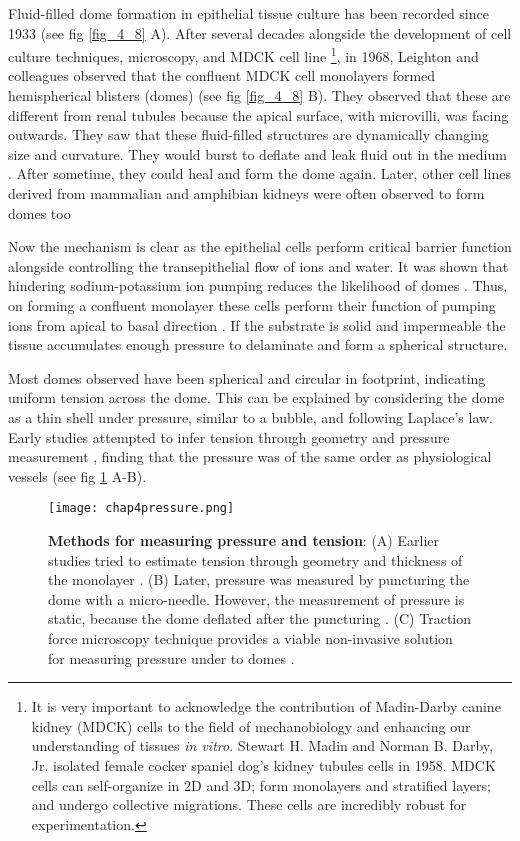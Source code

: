 Fluid-filled dome formation in epithelial tissue culture has been recorded since 1933 \cite{cameron1953} (see fig \ref{fig_4_8} A). After several decades alongside the development of cell culture techniques, microscopy, and MDCK cell line \footnote{It is very important to acknowledge the contribution of Madin-Darby canine kidney (MDCK) cells to the field of mechanobiology and enhancing our understanding of tissues \textit{in vitro}. Stewart H. Madin and Norman B. Darby, Jr. isolated female cocker spaniel dog’s kidney tubules cells in 1958. MDCK cells can self-organize in 2D and 3D; form monolayers and stratified layers; and undergo collective migrations. These cells are incredibly robust for experimentation.}, in 1968, Leighton and colleagues observed that the confluent MDCK cell monolayers formed hemispherical blisters (domes) \cite{leighton1969} (see fig \ref{fig_4_8} B). They observed that these are different from renal tubules because the apical surface, with microvilli, was facing outwards. They saw that these fluid-filled structures are dynamically changing size and curvature. They would burst to deflate and leak fluid out in the medium \cite{valentich1979}. After sometime, they could heal and form the dome again. Later, other cell lines derived from mammalian and amphibian kidneys were often observed to form domes too \cite{dulbecco1980, leighton1981, lever1979}
	
Now the mechanism is clear as the epithelial cells perform critical barrier function alongside controlling the transepithelial flow of ions and water. It was shown that hindering sodium-potassium ion pumping reduces the likelihood of domes \cite{leighton1969}. Thus, on forming a confluent monolayer these cells perform their function of pumping ions from apical to basal direction \cite{valentich1979}. If the substrate is solid and impermeable the tissue accumulates enough pressure to delaminate and form a spherical structure.

Most domes observed have been spherical and circular in footprint, indicating uniform tension across the dome. This can be explained by considering the dome as a thin shell under pressure, similar to a bubble, and following Laplace's law. Early studies attempted to infer tension through geometry and pressure measurement \cite{tanner1983}, finding that the pressure was of the same order as physiological vessels (see fig \ref{fig_4_9} A-B).

\begin{figure}
	\centering
	\texttt{[image: chap4pressure.png]}
	\caption{\label{fig_4_9} \textbf{Methods for measuring pressure and tension}: (A) Earlier studies tried to estimate tension through geometry and thickness of the monolayer \cite{tanner1983}. (B) Later, pressure was measured by puncturing the dome with a micro-needle. However, the measurement of pressure is static, because the dome deflated after the puncturing \cite{choudhury2022}. (C) Traction force microscopy technique provides a viable non-invasive solution for measuring pressure under to domes \cite{latorre2018}.
	}
\end{figure}

